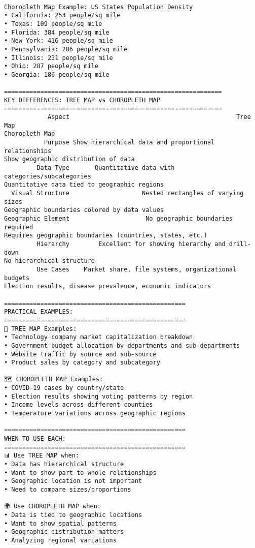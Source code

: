 \documentclass[11pt]{article}
\begin{document}
    \begin{center}
    \end{center}
    { \hspace*{\fill} \\}
    
    \begin{Verbatim}[commandchars=\\\{\}]
Choropleth Map Example: US States Population Density
• California: 253 people/sq mile
• Texas: 109 people/sq mile
• Florida: 384 people/sq mile
• New York: 416 people/sq mile
• Pennsylvania: 286 people/sq mile
• Illinois: 231 people/sq mile
• Ohio: 287 people/sq mile
• Georgia: 186 people/sq mile

============================================================
KEY DIFFERENCES: TREE MAP vs CHOROPLETH MAP
============================================================
            Aspect                                              Tree Map
Choropleth Map
           Purpose Show hierarchical data and proportional relationships
Show geographic distribution of data
         Data Type       Quantitative data with categories/subcategories
Quantitative data tied to geographic regions
  Visual Structure                    Nested rectangles of varying sizes
Geographic boundaries colored by data values
Geographic Element                     No geographic boundaries required
Requires geographic boundaries (countries, states, etc.)
         Hierarchy        Excellent for showing hierarchy and drill-down
No hierarchical structure
         Use Cases    Market share, file systems, organizational budgets
Election results, disease prevalence, economic indicators

==================================================
PRACTICAL EXAMPLES:
==================================================
🔲 TREE MAP Examples:
• Technology company market capitalization breakdown
• Government budget allocation by departments and sub-departments
• Website traffic by source and sub-source
• Product sales by category and subcategory

🗺️ CHOROPLETH MAP Examples:
• COVID-19 cases by country/state
• Election results showing voting patterns by region
• Income levels across different counties
• Temperature variations across geographic regions

==================================================
WHEN TO USE EACH:
==================================================
📊 Use TREE MAP when:
• Data has hierarchical structure
• Want to show part-to-whole relationships
• Geographic location is not important
• Need to compare sizes/proportions

🌍 Use CHOROPLETH MAP when:
• Data is tied to geographic locations
• Want to show spatial patterns
• Geographic distribution matters
• Analyzing regional variations
    \end{Verbatim}
\end{document}
